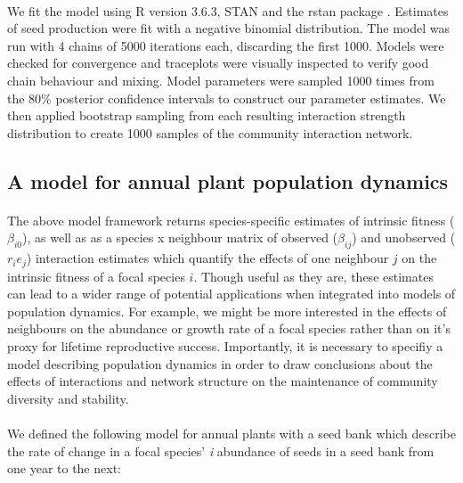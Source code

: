 \documentclass[a4,12pt]{article}
\begin{document}
        \paragraph{}
        We fit the model using R version 3.6.3, STAN and the rstan package \parencite{R2020, Carpenter2017, Rstan2020}. Estimates of seed production were fit with a negative binomial distribution. The model was run with 4 chains of 5000 iterations each, discarding the first 1000. Models were checked for convergence and traceplots were visually inspected to verify good chain behaviour and mixing. Model parameters were sampled 1000 times from the 80\% posterior confidence intervals to construct our parameter estimates. We then applied bootstrap sampling from each resulting interaction strength distribution to create 1000 samples of the community interaction network.

        \subsection{A model for annual plant population dynamics}

        \paragraph{}
        The above model framework returns species-specific estimates of intrinsic fitness ($\beta_{i0}$), as well as as a species x neighbour matrix of observed ($\beta_{ij}$) and unobserved ($r_i e_j$) interaction estimates which quantify the effects of one neighbour $j$ on the intrinsic fitness of a focal species $i$. Though useful as they are, these estimates can lead to a wider range of potential applications when integrated into models of population dynamics. For example, we might be more interested in the effects of neighbours on the abundance or growth rate of a focal species rather than on it's proxy for lifetime reproductive success. Importantly, it is necessary to specifiy a model describing population dynamics in order to draw conclusions about the effects of interactions and network structure on the maintenance of community diversity and stability. 

        \paragraph{} 
        We defined the following model for annual plants with a seed bank \parencite{Levine2009, Mayfield2017, Bimler2018} which describe the rate of change in a focal species' \textit{i} abundance of seeds in a seed bank from one year to the next: 
    
\end{document}
